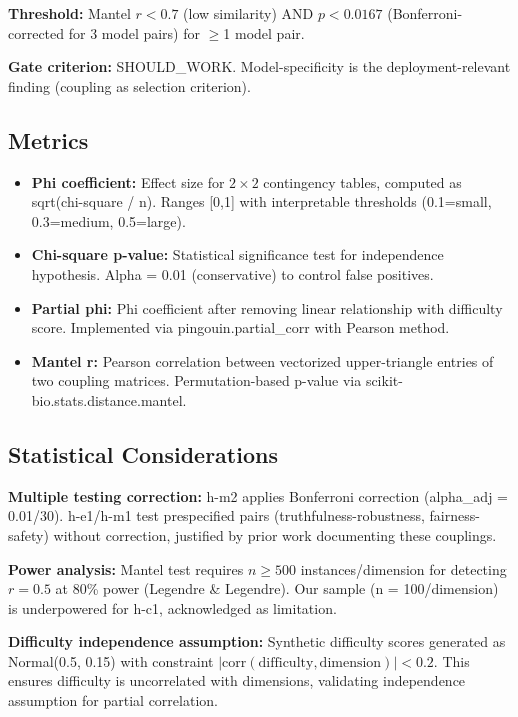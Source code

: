 \textbf{Threshold:} Mantel $r < 0.7$ (low similarity) AND $p < 0.0167$ (Bonferroni-corrected for 3 model pairs) for $\geq$1 model pair.

\textbf{Gate criterion:} SHOULD\_WORK. Model-specificity is the deployment-relevant finding (coupling as selection criterion).

\subsection{Metrics}

\begin{itemize}
\item \textbf{Phi coefficient:} Effect size for $2\times2$ contingency tables, computed as sqrt(chi-square / n). Ranges [0,1] with interpretable thresholds (0.1=small, 0.3=medium, 0.5=large).
\item \textbf{Chi-square p-value:} Statistical significance test for independence hypothesis. Alpha = 0.01 (conservative) to control false positives.
\item \textbf{Partial phi:} Phi coefficient after removing linear relationship with difficulty score. Implemented via pingouin.partial\_corr with Pearson method.
\item \textbf{Mantel r:} Pearson correlation between vectorized upper-triangle entries of two coupling matrices. Permutation-based p-value via scikit-bio.stats.distance.mantel.
\end{itemize}

\subsection{Statistical Considerations}

\textbf{Multiple testing correction:} h-m2 applies Bonferroni correction (alpha\_adj = 0.01/30). h-e1/h-m1 test prespecified pairs (truthfulness-robustness, fairness-safety) without correction, justified by prior work documenting these couplings.

\textbf{Power analysis:} Mantel test requires $n \geq 500$ instances/dimension for detecting $r = 0.5$ at 80\% power (Legendre \& Legendre). Our sample (n = 100/dimension) is underpowered for h-c1, acknowledged as limitation.

\textbf{Difficulty independence assumption:} Synthetic difficulty scores generated as Normal(0.5, 0.15) with constraint $|\text{corr}(\text{difficulty}, \text{dimension})| < 0.2$. This ensures difficulty is uncorrelated with dimensions, validating independence assumption for partial correlation.

